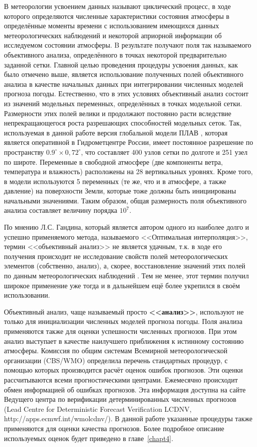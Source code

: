 В метеорологии усвоением данных называют циклический процесс, в ходе которого определяются численные характеристики состояния атмосферы в определённые моменты времени с использованием имеющихся данных метеорологических наблюдений и некоторой априорной информации об исследуемом состоянии атмосферы. B результате получают поля так называемого объективного анализа, определённого в точках некоторой предварительно заданной сетки.
Главной целью проведения процедуры усвоения данных, как было отмечено выше, является использование полученных полей объективного анализа в качестве начальных данных при интегрировании численных моделей прогноза погоды.
Естественно, что в этих условиях объективный анализ состоит из значений модельных переменных, определённых в точках модельной сетки. Размерности этих полей велики и продолжают постоянно расти вследствие непрекращающегося роста разрешающих способностей модельных сеток. Так, используемая в данной работе версия глобальной модели ПЛАВ \cite{Tolstykh-SLAV}, которая является оперативной в Гидрометцентре России, имеет постоянное разрешение по пространству ${0.9^{\circ}\times0,72^{\circ}}$, что составляет 400 узлов сетки по долготе и 251 узел по широте. Переменные в свободной атмосфере (две компоненты ветра, температура и влажность) расположены на 28 вертикальных уровнях. Кроме того, в модели используются 5 переменных (те же, что и в атмосфере, а также давление) на поверхности Земли, которые тоже должны быть инициированы начальными значениями. Таким образом, общая размерность поля объективного анализа составляет величину порядка ${10^7}$.

По мнению Л.С. Гандина, который является автором одного из наиболее долго и успешно применяемого метода, называемого <<Оптимальная интерполяция>>, термин <<объективный анализ>> не является удачным, т.к. в ходе его получения происходит не исследование свойств полей метеорологических элементов (собственно, анализ), а, скорее, восстановление значений этих полей по данным метеорологических наблюдений \cite[с.~5]{Gandin-1963}. Тем не менее, этот термин получил широкое применение уже тогда и в дальнейшем ещё более укрепился в своём использовании.

Объективный анализ, чаще называемый просто \textbf{<<анализ>>}, используют не только для инициализации численных моделей прогноза погоды. Поля анализа применяются также для оценки успешности численных прогнозов. При этом анализ выступает в качестве наилучшего приближения к истинному состоянию атмосферы. Комиссия по общим системам Всемирной метеорологической организации (CBS/WMO) определила перечень стандартных процедур\cite{WMO-CBS}, с помощью которых производится расчёт оценок ошибок прогнозов. Эти оценки рассчитываются всеми прогностическими центрами. Ежемесячно происходит обмен информацией об ошибках прогнозов. Эта информация доступна на сайте Ведущего центра по верификации детерминированных численных прогнозов (Lead Centre for Deterministic Forecast Verification LCDNV, http://apps.ecmwf.int/wmolcdnv/). В данной работе указанные процедуры также применяются для оценки качества прогнозов. Более подробное описание используемых оценок будет приведено в главе~\ref{chapt4}.

